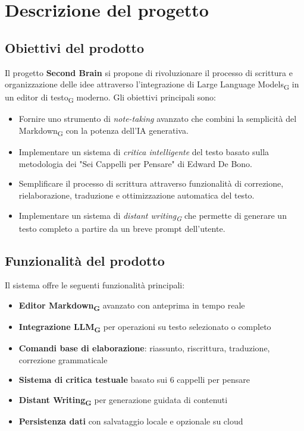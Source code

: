 \documentclass[11pt,a4paper]{article}
\newcommand{\gls}[1]{#1\textsubscript{G}}
\begin{document}
\newpage

\section{Descrizione del progetto}
\subsection{Obiettivi del prodotto}
Il progetto \textbf{Second Brain} si propone di rivoluzionare il processo di scrittura e organizzazione delle idee attraverso l'integrazione di Large Language Models\textsubscript{G} in un \gls{editor di testo} moderno. Gli obiettivi principali sono:

\begin{itemize}
    \item Fornire uno strumento di \textit{note-taking} avanzato che combini la semplicità del \gls{Markdown} con la potenza dell'IA generativa.
    \item Implementare un sistema di \textit{critica intelligente} del testo basato sulla metodologia dei "Sei Cappelli per Pensare" di Edward De Bono.
    \item Semplificare il processo di scrittura attraverso funzionalità di correzione, rielaborazione, traduzione e ottimizzazione automatica del testo.
    \item Implementare un sistema di \textit{\gls{distant writing}} che permette di generare un testo completo a partire da un breve prompt dell'utente.
\end{itemize}


\subsection{Funzionalità del prodotto}
Il sistema offre le seguenti funzionalità principali:

\begin{itemize}
    \item \textbf{Editor \gls{Markdown}} avanzato con anteprima in tempo reale
    \item \textbf{Integrazione LLM\textsubscript{G}} per operazioni su testo selezionato o completo
    \item \textbf{Comandi base di elaborazione}: riassunto, riscrittura, traduzione, correzione grammaticale
    \item \textbf{Sistema di critica testuale} basato sui 6 cappelli per pensare
    \item \textbf{\gls{Distant Writing}} per generazione guidata di contenuti
    \item \textbf{Persistenza dati} con salvataggio locale e opzionale su cloud
\end{itemize}
\end{document}
